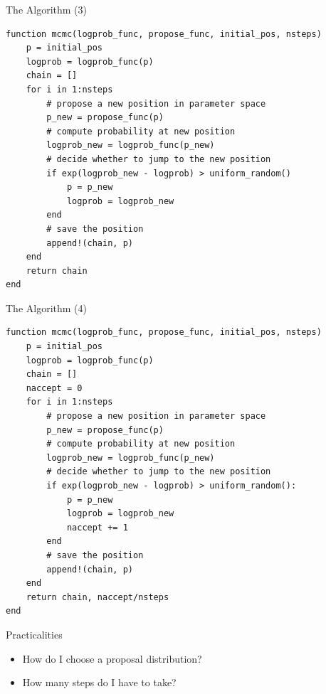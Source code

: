 \documentclass{beamer}
\begin{document}
\begin{frame}[fragile]{The Algorithm (3)}
\begin{footnotesize}
\begin{verbatim}
function mcmc(logprob_func, propose_func, initial_pos, nsteps)
    p = initial_pos
    logprob = logprob_func(p)
    chain = []
    for i in 1:nsteps
        # propose a new position in parameter space
        p_new = propose_func(p)
        # compute probability at new position
        logprob_new = logprob_func(p_new)
        # decide whether to jump to the new position
        if exp(logprob_new - logprob) > uniform_random()
            p = p_new
            logprob = logprob_new
        end
        # save the position
        append!(chain, p)
    end
    return chain
end
\end{verbatim}
\end{footnotesize}
\end{frame}

\begin{frame}[fragile]{The Algorithm (4)}
\begin{footnotesize}
\begin{verbatim}
function mcmc(logprob_func, propose_func, initial_pos, nsteps)
    p = initial_pos
    logprob = logprob_func(p)
    chain = []
    naccept = 0
    for i in 1:nsteps
        # propose a new position in parameter space
        p_new = propose_func(p)
        # compute probability at new position
        logprob_new = logprob_func(p_new)
        # decide whether to jump to the new position
        if exp(logprob_new - logprob) > uniform_random():
            p = p_new
            logprob = logprob_new
            naccept += 1
        end
        # save the position
        append!(chain, p)
    end
    return chain, naccept/nsteps
end
\end{verbatim}
\end{footnotesize}
\end{frame}





%
%
%


\begin{frame}{Practicalities}
\begin{itemize}
\item How do I choose a proposal distribution?
\item How many steps do I have to take?
\end{itemize}
\end{frame}
\end{document}
